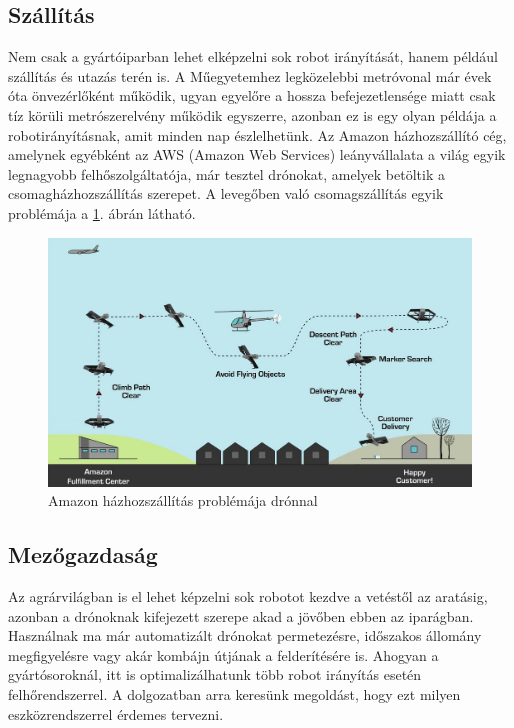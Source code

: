 \subsection{Szállítás}
Nem csak a gyártóiparban lehet elképzelni sok robot irányítását, hanem például szállítás és utazás terén is. A Műegyetemhez legközelebbi metróvonal már évek óta önvezérlőként működik, ugyan egyelőre a hossza befejezetlensége miatt csak tíz körüli metrószerelvény működik egyszerre, azonban ez is egy olyan példája a robotirányításnak, amit minden nap észlelhetünk. Az Amazon házhozszállító cég, amelynek egyébként az AWS (Amazon Web Services) leányvállalata a világ egyik legnagyobb felhőszolgáltatója, már tesztel drónokat, amelyek betöltik a csomagházhozszállítás szerepet. A levegőben való csomagszállítás egyik problémája a \ref{fig:drone-delivery}. ábrán látható.
\begin{figure}
\centering
\includegraphics[width=\linewidth]{figures/aws-drone-delivery.jpg}
\caption{Amazon házhozszállítás problémája drónnal \cite{drone-delivery}}
\label{fig:drone-delivery}
\end{figure}
\subsection{Mezőgazdaság}
Az agrárvilágban is el lehet képzelni sok robotot kezdve a vetéstől az aratásig, azonban a drónoknak kifejezett szerepe akad a jövőben ebben az iparágban. Használnak ma már automatizált drónokat permetezésre, időszakos állomány megfigyelésre vagy akár kombájn útjának a felderítésére is. Ahogyan a gyártósoroknál, itt is optimalizálhatunk több robot irányítás esetén felhőrendszerrel. A dolgozatban arra keresünk megoldást, hogy ezt milyen eszközrendszerrel érdemes tervezni.
